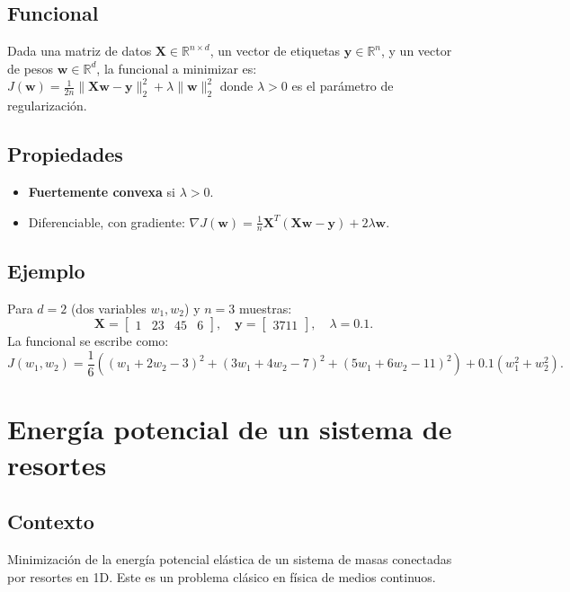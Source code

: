 \documentclass[12pt]{book}
\theoremstyle{definition}
\theoremstyle{plain}
\theoremstyle{remark}
\begin{document}
\subsection{Funcional}
Dada una matriz de datos $ \mathbf{X} \in \mathbb{R}^{n \times d} $, un vector de etiquetas $ \mathbf{y} \in \mathbb{R}^n $, y un vector de pesos $ \mathbf{w} \in \mathbb{R}^d $, la funcional a minimizar es:
$
J(\mathbf{w}) = \frac{1}{2n} \| \mathbf{X}\mathbf{w} - \mathbf{y}\|_2^2 + \lambda \|\mathbf{w}\|_2^2
$
donde $ \lambda > 0 $ es el parámetro de regularización.

\subsection{Propiedades}
\begin{itemize}
    \item \textbf{Fuertemente convexa} si $ \lambda > 0 $.
    \item Diferenciable, con gradiente:
    $
    \nabla J(\mathbf{w}) = \frac{1}{n} \mathbf{X}^T (\mathbf{X}\mathbf{w} - \mathbf{y}) + 2\lambda \mathbf{w}
    $.
\end{itemize}

\subsection{Ejemplo}
Para $ d = 2 $ (dos variables $ w_1, w_2 $) y $ n = 3 $ muestras:
$$
\mathbf{X} = \begin{bmatrix} 1 & 2  3 & 4  5 & 6 \end{bmatrix}, \quad \mathbf{y} = \begin{bmatrix} 3  7  11 \end{bmatrix}, \quad \lambda = 0.1.
$$
La funcional se escribe como: \scriptsize
$$
J(w_1, w_2) = \frac{1}{6} \left( (w_1 + 2w_2 - 3)^2 + (3w_1 + 4w_2 - 7)^2 + (5w_1 + 6w_2 - 11)^2 \right) + 0.1(w_1^2 + w_2^2).
$$
\normalsize


\section{Energía potencial de un sistema de resortes}
\subsection{Contexto}
Minimización de la energía potencial elástica de un sistema de masas conectadas por resortes en 1D. Este es un problema clásico en física de medios continuos.
\end{document}

